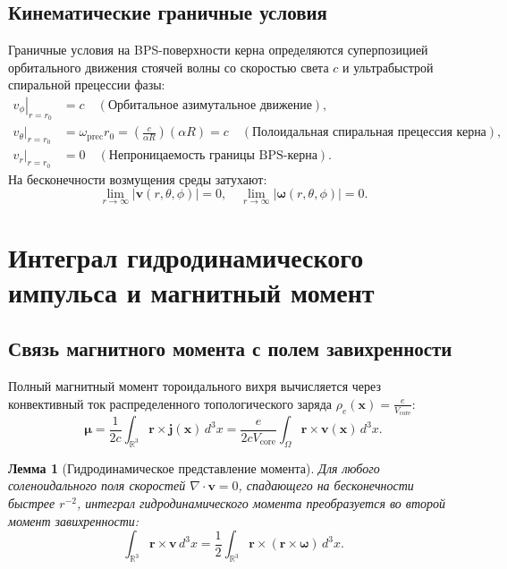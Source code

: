 \documentclass[12pt,a4paper]{article}
\newtheorem{lemma}{Лемма}
\begin{document}
	\subsection{Кинематические граничные условия}
	Граничные условия на BPS-поверхности керна определяются суперпозицией орбитального движения стоячей волны со скоростью света $c$ и ультрабыстрой спиральной прецессии фазы:
	\begin{align}
		\left. v_\phi \right|_{r = r_0} &= c \quad (\text{Орбитальное азимутальное движение}), \\
		\left. v_\theta \right|_{r = r_0} &= \omega_{\text{prec}} r_0 = \left(\frac{c}{\alpha R}\right) (\alpha R) = c \quad (\text{Полоидальная спиральная прецессия керна}), \\
		\left. v_r \right|_{r = r_0} &= 0 \quad (\text{Непроницаемость границы BPS-керна}).
	\end{align}
	На бесконечности возмущения среды затухают:
	\begin{equation}
		\lim_{r \to \infty} |\mathbf{v}(r, \theta, \phi)| = 0, \quad \lim_{r \to \infty} |\boldsymbol{\omega}(r, \theta, \phi)| = 0.
	\end{equation}
	
	\section{Интеграл гидродинамического импульса и магнитный момент}
	
	\subsection{Связь магнитного момента с полем завихренности}
	Полный магнитный момент тороидального вихря вычисляется через конвективный ток распределенного топологического заряда $\rho_e(\mathbf{x}) = \frac{e}{V_{\text{core}}}$:
	\begin{equation}
		\boldsymbol{\mu} = \frac{1}{2c} \int_{\mathbb{R}^3} \mathbf{r} \times \mathbf{j}(\mathbf{x}) \, d^3x = \frac{e}{2c V_{\text{core}}} \int_{\Omega} \mathbf{r} \times \mathbf{v}(\mathbf{x}) \, d^3x.
	\end{equation}
	
	\begin{lemma}[Гидродинамическое представление момента]
		Для любого соленоидального поля скоростей $\nabla \cdot \mathbf{v} = 0$, спадающего на бесконечности быстрее $r^{-2}$, интеграл гидродинамического момента преобразуется во второй момент завихренности:
		\begin{equation}
			\int_{\mathbb{R}^3} \mathbf{r} \times \mathbf{v} \, d^3x = \frac{1}{2} \int_{\mathbb{R}^3} \mathbf{r} \times (\mathbf{r} \times \boldsymbol{\omega}) \, d^3x.
		\end{equation}
	\end{lemma}
	
\end{document}
